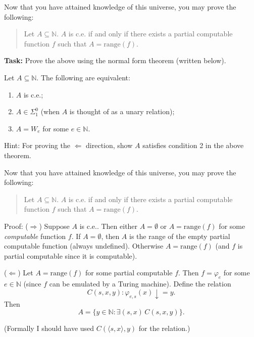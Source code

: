 \documentclass{beamer}
\begin{document}
\begin{frame}{\emojimoyai\emojimoyai\emojimoyai\emojimoyai\emojimoyai\emojimoyai}
Now that you have attained knowledge of this universe, you may prove the following:
\begin{quotation}
Let $A \subseteq \mathbb N$. $A$ is c.e. if and only if there exists a partial computable function $f$ such that $A = \text{range}(f)$.
\end{quotation}

\textbf{Task:} Prove the above using the normal form theorem (written below).

\begin{theorem}
Let $A \subseteq \mathbb N$. The following are equivalent:
\begin{enumerate}
\item $A$ is c.e.;
\item $A \in \Sigma^0_1$ (when $A$ is thought of as a unary relation);
\item $A = W_e$ for some $e \in \mathbb N$.
\end{enumerate}
\end{theorem}


Hint: For proving the $\Leftarrow$ direction, show $A$ satisfies condition 2 in the above theorem.


\end{frame}

\begin{frame}{\emojimoyai\emojimoyai\emojimoyai\emojimoyai\emojimoyai\emojimoyai}
Now that you have attained knowledge of this universe, you may prove the following:
\begin{quotation}
Let $A \subseteq \mathbb N$. $A$ is c.e. if and only if there exists a partial computable function $f$ such that $A = \text{range}(f)$.
\end{quotation}

Proof: ($\Rightarrow$) Suppose $A$ is c.e.. Then either $A = \emptyset$ or $A = \text{range}(f)$ for some \textit{computable} function $f$. If $A = \emptyset$, then $A$ is the range of the empty partial computable function (always undefined). Otherwise $A = \text{range}(f)$ (and $f$ is partial computable since it is computable).

\vspace{2mm}

($\Leftarrow$) Let $A = \text{range}(f)$ for some partial computable $f$. Then $f = \varphi_e$ for some $e \in \mathbb N$ (since $f$ can be emulated by a Turing machine). Define the relation
$$C(s, x, y): \varphi_{e, s}(x) \downarrow = y.$$
Then 
$$A = \{y \in \mathbb N: \exists (s, x)  \, C(s, x, y) \}.$$


(Formally I should have used $C(\langle s, x \rangle, y)$ for the relation.)
\end{frame}
\end{document}
